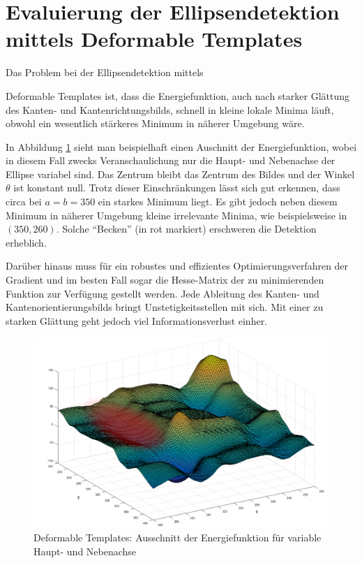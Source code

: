 \section{Evaluierung der Ellipsendetektion mittels Deformable Templates}
Das Problem bei der Ellipsendetektion mittels {Deformable Templates ist, dass die Energiefunktion, auch nach starker Glättung des Kanten- und Kantenrichtungsbilds, schnell in kleine lokale Minima läuft, obwohl ein wesentlich stärkeres Minimum in näherer Umgebung wäre.

In Abbildung \ref{fig:deformable} sieht man beispielhaft einen Auschnitt der Energiefunktion, wobei in diesem Fall zwecks Veranschaulichung nur die Haupt- und Nebenachse der Ellipse variabel sind. Das Zentrum bleibt das Zentrum des Bildes und der Winkel $\theta$ ist konstant null. Trotz dieser Einschränkungen lässt sich gut erkennen, dass circa bei $a = b = 350$ ein starkes Minimum liegt. Es gibt jedoch neben diesem Minimum in näherer Umgebung kleine irrelevante Minima, wie beispielsweise in $(350, 260)$. Solche "`Becken"' (in rot markiert) erschweren die Detektion erheblich.

Darüber hinaus muss für ein robustes und effizientes Optimierungsverfahren der Gradient und im besten Fall sogar die Hesse-Matrix der zu minimierenden Funktion zur Verfügung gestellt werden.  Jede Ableitung des Kanten- und Kantenorientierungsbilds bringt Unstetigkeitsstellen mit sich. Mit einer zu starken Glättung geht jedoch viel Informationsverlust einher.


\begin{figure}[!htb]
	\centering
	\includegraphics[scale=.4]{images/deformableHighlighted.png}
	\caption{Deformable Templates: Ausschnitt der Energiefunktion für variable Haupt- und Nebenachse}
	\label{fig:deformable}
\end{figure}


}
